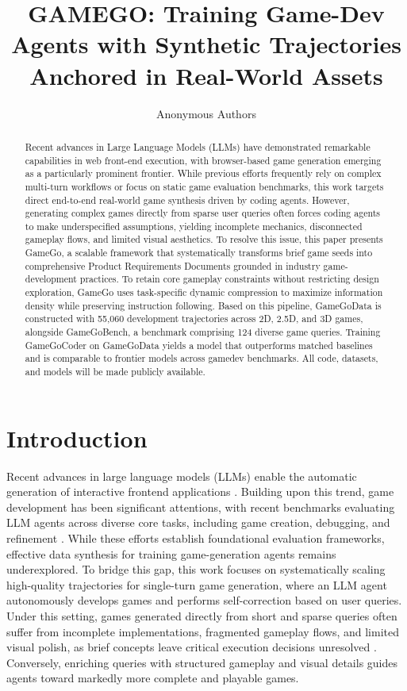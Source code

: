 \documentclass{article}
\title{GAMEGO: Training Game-Dev Agents with Synthetic Trajectories Anchored in Real-World Assets}
\author{Anonymous Authors}
\begin{document}
\maketitle

\begin{abstract}
Recent advances in Large Language Models (LLMs) have demonstrated remarkable capabilities in web front-end execution, with browser-based game generation emerging as a particularly prominent frontier. While previous efforts frequently rely on complex multi-turn workflows or focus on static game evaluation benchmarks, this work targets direct end-to-end real-world game synthesis driven by coding agents. However, generating complex games directly from sparse user queries often forces coding agents to make underspecified assumptions, yielding incomplete mechanics, disconnected gameplay flows, and limited visual aesthetics. To resolve this issue, this paper presents GameGo, a scalable framework that systematically transforms brief game seeds into comprehensive Product Requirements Documents grounded in industry game-development practices. To retain core gameplay constraints without restricting design exploration, GameGo uses task-specific dynamic compression to maximize information density while preserving instruction following. Based on this pipeline, GameGoData is constructed with 55,060 development trajectories across 2D, 2.5D, and 3D games, alongside GameGoBench, a benchmark comprising 124 diverse game queries. Training GameGoCoder on GameGoData yields a model that outperforms matched baselines and is comparable to frontier models across gamedev benchmarks. All code, datasets, and models will be made publicly available.

\end{abstract}



\section{Introduction}
\label{sec:introduction} 
Recent advances in large language models (LLMs) enable the automatic generation of interactive frontend applications \cite{jiang2026opengame,li2026mm}. Building upon this trend, game development has been significant attentions, with recent benchmarks evaluating LLM agents across diverse core tasks, including game creation, debugging, and refinement \cite{chen2026gamexpert,chi2026gamedevbench}. While these efforts establish foundational evaluation frameworks, effective data synthesis for training game-generation agents remains underexplored. To bridge this gap, this work focuses on systematically scaling high-quality trajectories for single-turn game generation, where an LLM agent autonomously develops games and performs self-correction based on user queries. Under this setting, games generated directly from short and sparse queries often suffer from incomplete implementations, fragmented gameplay flows, and limited visual polish, as brief concepts leave critical execution decisions unresolved \cite{mu2024clarifygpt}. Conversely, enriching queries with structured gameplay and visual details guides agents toward markedly more complete and playable games.
\end{document}
